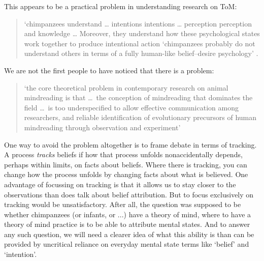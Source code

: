 \documentclass[12pt,a4paper]{article}
\newcommand{\E}[1]{\emph{#1}}
\begin{document}
This appears to be a practical problem in understanding research on ToM:
%
\begin{quote}
‘chimpanzees understand …  
intentions intentions … perception perception and knowledge
… Moreover, they understand how these psychological states work together to produce intentional action
        ‘chimpanzees probably do not understand others in terms of a fully human-like belief–desire
        psychology’ 
 \citep[p.~191]{Call:2008di}.
\end{quote}
%


We are not the first people to have noticed that there is a problem:
\begin{quote}
‘the core theoretical problem in contemporary research on animal mindreading is 
that \ldots\ the conception of mindreading that dominates the field
\ldots\ is too underspecified to allow effective communication among researchers, 
and reliable identification of evolutionary precursors of human mindreading through 
observation and experiment’
\citep[p.~321]{heyes:2014_animal}
%
%
\end{quote}
%

One way to avoid the problem altogether is to frame debate in terms of tracking.
A process \E{tracks} beliefs if how that process unfolds nonaccidentally depends, perhaps within limits, on facts about beliefs.  
Where there is tracking, you can change how the process unfolds by changing facts about what is believed.
One advantage of focussing on tracking is that it allows us to stay closer to the observations than does talk about belief attribution.
But to focus exclusively on tracking would be unsatisfactory.
After all, the question was supposed to be whether chimpanzees (or infants, or ...) have a theory of mind, where to have a theory of mind practice is to be able to attribute mental states.
And to answer any such question, we will need a clearer idea of what this ability is than can be provided by uncritical reliance on everyday mental state terms like ‘belief’ and ‘intention’.
\end{document}
